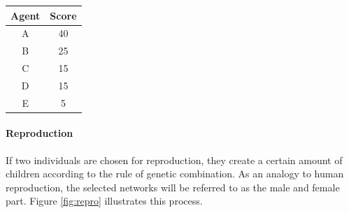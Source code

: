 \documentclass[10pt,a4paper,DIV=11]{scrreprt}
\begin{document}
\begin{minipage}{\textwidth}
  \begin{minipage}[b]{0.49\textwidth}
    \centering
        \label{fig:roul}
  \end{minipage}
  \hfill
  \begin{minipage}[b]{0.49\textwidth}
    \centering
      \begin{tabular}{|c|c|} \hline
         Agent & Score \\ \hline
         A & 40 \\ \hline
         B & 25 \\ \hline
         C & 15 \\ \hline
         D & 15 \\ \hline
         E & 5  \\ \hline
      \end{tabular}
          \label{tab:rank}
    \end{minipage}
  \end{minipage}

\paragraph{Reproduction}
If two individuals are chosen for reproduction, they create a certain amount of children according to the rule of genetic combination. 
As an analogy to human reproduction, the selected networks will be referred to as the male and female part. Figure \ref{fig:repro} illustrates 
this process. 
\end{document}
